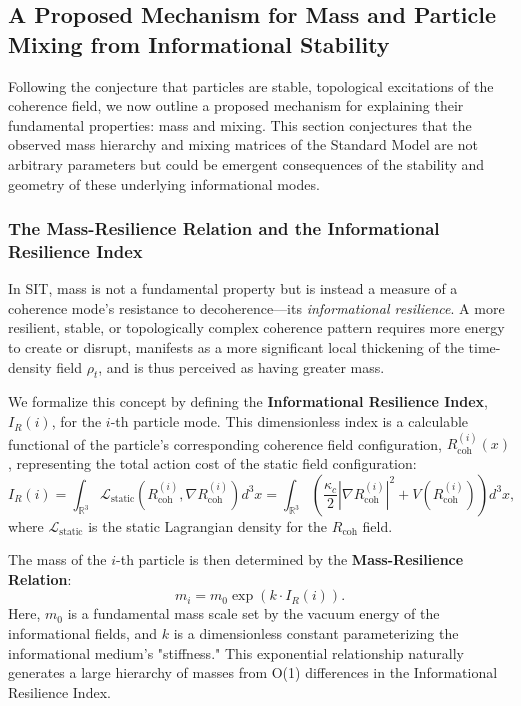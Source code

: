\subsection{A Proposed Mechanism for Mass and Particle Mixing from Informational Stability}

Following the conjecture that particles are stable, topological excitations of the coherence field, we now outline a proposed mechanism for explaining their fundamental properties: mass and mixing. This section conjectures that the observed mass hierarchy and mixing matrices of the Standard Model are not arbitrary parameters but could be emergent consequences of the stability and geometry of these underlying informational modes.

\subsubsection{The Mass-Resilience Relation and the Informational Resilience Index}

In SIT, mass is not a fundamental property but is instead a measure of a coherence mode's resistance to decoherence---its \textit{informational resilience}. A more resilient, stable, or topologically complex coherence pattern requires more energy to create or disrupt, manifests as a more significant local thickening of the time-density field $\rho_t$, and is thus perceived as having greater mass.

We formalize this concept by defining the \textbf{Informational Resilience Index}, $I_R(i)$, for the $i$-th particle mode. This dimensionless index is a calculable functional of the particle's corresponding coherence field configuration, $R_{\text{coh}}^{(i)}(x)$, representing the total action cost of the static field configuration:
\begin{equation}
    I_R(i) = \int_{\mathbb{R}^3} \mathcal{L}_{\text{static}}\left( R_{\text{coh}}^{(i)}, \nabla R_{\text{coh}}^{(i)} \right) d^3x = \int_{\mathbb{R}^3} \left( \frac{\kappa_c}{2} |\nabla R_{\text{coh}}^{(i)}|^2 + V(R_{\text{coh}}^{(i)}) \right) d^3x,
    \label{eq:resilience_index_consolidated}
\end{equation}
where $\mathcal{L}_{\text{static}}$ is the static Lagrangian density for the $R_{\text{coh}}$ field.

The mass of the $i$-th particle is then determined by the \textbf{Mass-Resilience Relation}:
\begin{equation}
    m_i = m_0 \exp(k \cdot I_R(i)).
    \label{eq:mass_resilience_relation_consolidated}
\end{equation}
Here, $m_0$ is a fundamental mass scale set by the vacuum energy of the informational fields, and $k$ is a dimensionless constant parameterizing the informational medium's "stiffness." This exponential relationship naturally generates a large hierarchy of masses from O(1) differences in the Informational Resilience Index.

